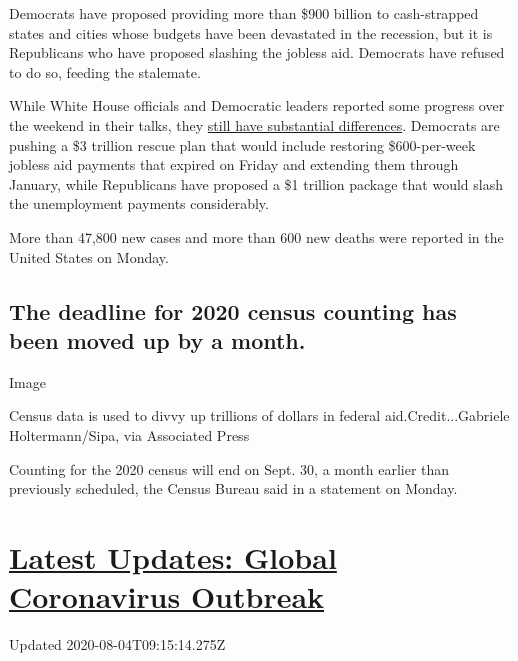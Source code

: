 Democrats have proposed providing more than \$900 billion to
cash-strapped states and cities whose budgets have been devastated in
the recession, but it is Republicans who have proposed slashing the
jobless aid. Democrats have refused to do so, feeding the stalemate.

While White House officials and Democratic leaders reported some
progress over the weekend in their talks, they
\href{https://www.nytimes.com/2020/08/02/us/politics/coronavirus-jobless-aid.html}{still
have substantial differences}. Democrats are pushing a \$3 trillion
rescue plan that would include restoring \$600-per-week jobless aid
payments that expired on Friday and extending them through January,
while Republicans have proposed a \$1 trillion package that would slash
the unemployment payments considerably.

More than 47,800 new cases and more than 600 new deaths were reported in
the United States on Monday.

\hypertarget{the-deadline-for-2020-census-counting-has-been-moved-up-by-a-month}{%
\subsection{The deadline for 2020 census counting has been moved up by a
month.}\label{the-deadline-for-2020-census-counting-has-been-moved-up-by-a-month}}

Image

Census data is used to divvy up trillions of dollars in federal
aid.Credit...Gabriele Holtermann/Sipa, via Associated Press

Counting for the 2020 census will end on Sept. 30, a month earlier than
previously scheduled, the Census Bureau said in a statement on Monday.

\hypertarget{latest-updates-global-coronavirus-outbreak}{%
\section{\texorpdfstring{\href{https://www.nytimes.com/2020/08/04/world/coronavirus-covid-19.html?action=click\&pgtype=Article\&state=default\&region=MAIN_CONTENT_1\&context=storylines_live_updates}{Latest
Updates: Global Coronavirus
Outbreak}}{Latest Updates: Global Coronavirus Outbreak}}\label{latest-updates-global-coronavirus-outbreak}}

Updated 2020-08-04T09:15:14.275Z

